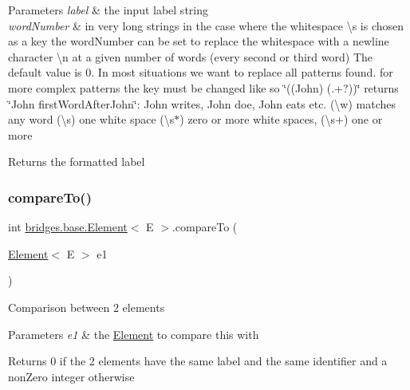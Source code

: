 \begin{DoxyParams}{Parameters}
{\em label} & the input label string\\
\hline
{\em word\+Number} & in very long strings in the case where the whitespace \textbackslash{}s is chosen as a key the word\+Number can be set to replace the whitespace with a newline character \textbackslash{}n at a given number of words (every second or third word) The default value is 0. In most situations we want to replace all patterns found. for more complex patterns the key must be changed like so \char`\"{}((\+John) (.+?))\char`\"{} returns \char`\"{}\+John first\+Word\+After\+John\char`\"{}\+: John writes, John doe, John eats etc. (\textbackslash{}w) matches any word (\textbackslash{}s) one white space (\textbackslash{}s$\ast$) zero or more white spaces, (\textbackslash{}s+) one or more\\
\hline
\end{DoxyParams}
\begin{DoxyReturn}{Returns}
the formatted label 
\end{DoxyReturn}
\hypertarget{classbridges_1_1base_1_1_element_a6cd4c4f15c6a4f87f59e443cffe87a20}{}\label{classbridges_1_1base_1_1_element_a6cd4c4f15c6a4f87f59e443cffe87a20} 
\subsubsection{\texorpdfstring{compare\+To()}{compareTo()}}
{\footnotesize\ttfamily int \hyperlink{classbridges_1_1base_1_1_element}{bridges.\+base.\+Element}$<$ E $>$.compare\+To (\begin{DoxyParamCaption}\item[{\hyperlink{classbridges_1_1base_1_1_element}{Element}$<$ E $>$}]{e1 }\end{DoxyParamCaption})}

Comparison between 2 elements 
\begin{DoxyParams}{Parameters}
{\em e1} & the \hyperlink{classbridges_1_1base_1_1_element}{Element} to compare this with \\
\hline
\end{DoxyParams}
\begin{DoxyReturn}{Returns}
0 if the 2 elements have the same label and the same identifier and a non\+Zero integer otherwise 
\end{DoxyReturn}
\hypertarget{classbridges_1_1base_1_1_element_aff10d60700eb1aceca5c0b519bdccccb}{}\label{classbridges_1_1base_1_1_element_aff10d60700eb1aceca5c0b519bdccccb} 
